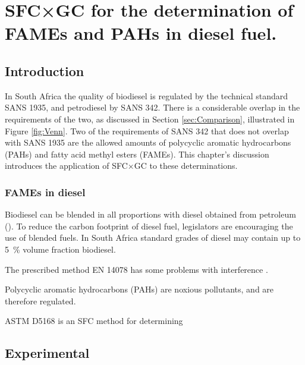 
\begin{savequote}[\quotewidth]

\end{savequote}

\chapter{SFC×GC for the determination of FAMEs and PAHs in diesel fuel.} %
\label{Chapter7} %

\section{Introduction}

In South Africa the quality of biodiesel is regulated by the technical standard
SANS 1935, and petrodiesel by SANS 342. There is a considerable overlap in the
requirements of the two, as discussed in Section \ref{sec:Comparison},
illustrated in Figure \ref{fig:Venn}. Two of the requirements of SANS 342 that
does not overlap with SANS 1935 are the allowed amounts of polycyclic aromatic
hydrocarbons (PAHs) and fatty acid methyl esters (FAMEs). This chapter's
discussion introduces the application of SFC×GC to these determinations. 

\subsection{FAMEs in diesel}

Biodiesel can be blended in all proportions with diesel obtained from petroleum
(). To reduce the carbon footprint of diesel fuel,
legislators are encouraging the use of blended fuels. In South Africa standard
grades of diesel may contain up to \SI{5}{\percent} volume fraction biodiesel.

The prescribed method  EN 14078 has some problems with interference \autocite{Pinho2014} . 

Polycyclic aromatic hydrocarbons (PAHs) are noxious pollutants, and are therefore regulated. 

ASTM D5168 is an SFC method for determining

\section{Experimental}

